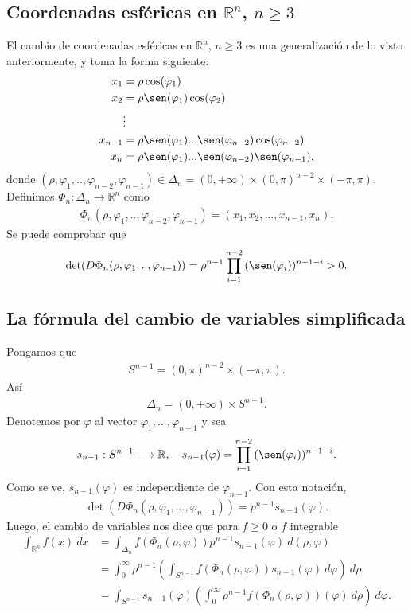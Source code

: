 \subsection{Coordenadas esféricas en $\mathbb{R}^n$, $n \ge 3$}
El cambio de coordenadas esféricas en $\mathbb{R}^n$, $n \ge 3$ es una generalización de lo visto anteriormente, y toma la forma siguiente:
\begin{align*}
    x_1 &= \rho \cos(\varphi_1) \\
    x_2 &= \rho \sen(\varphi_1) \cos(\varphi_2) \\
        & \vdots \\
    x_{n-1} &=  \rho \sen(\varphi_1) ... \sen(\varphi_{n-2}) \cos(\varphi_{n-2})\\
    x_{n} &=  \rho \sen(\varphi_1) ...\sen(\varphi_{n-2}) \sen(\varphi_{n-1}),
\end{align*}
donde $(\rho, \varphi_1,..,\varphi_{n-2},\varphi_{n-1}) \in \Delta_n = (0,+\infty)\times(0,\pi)^{n-2}\times(-\pi,\pi)$. Definimos $\Phi_n : \Delta_n \longrightarrow \mathbb{R}^n$ como
\begin{align*}
    \Phi_n(\rho, \varphi_1,..,\varphi_{n-2},\varphi_{n-1}) = (x_1,x_2,...,x_{n-1},x_n).
\end{align*}
Se puede comprobar que
\begin{align*}
    \det(D\Phi_n(\rho, \varphi_1,..,\varphi_{n-1})) = \rho^{n-1}\prod_{i=1}^{n-2}{(\sen(\varphi_i))^{n-1-i}} > 0.
\end{align*}

\subsection{La fórmula del cambio de variables simplificada}
Pongamos que
\begin{align*}
    S^{n-1} = (0,\pi)^{n-2}\times(-\pi,\pi).
\end{align*}
Así
\begin{align*}
    \Delta_n = (0,+\infty)\times S^{n-1}.
\end{align*}
Denotemos por $\varphi$ al vector $\varphi_1,...,\varphi_{n-1}$ y sea
\begin{align*}
    s_{n-1} : S^{n-1} \longrightarrow \mathbb{R}, \ \ \ s_{n-1}(\varphi) = \prod_{i=1}^{n-2}{(\sen(\varphi_i))^{n-1-i}}.
\end{align*}
Como se ve, $s_{n-1}(\varphi)$ es independiente de $\varphi_{n-1}$. Con esta notación,
\begin{align*}
    \det(D\Phi_n(\rho,\varphi_1,...,\varphi_{n-1})) = p^{n-1}s_{n-1}(\varphi).
\end{align*}
Luego, el cambio de variables nos dice que para $f \ge 0$ o $f$ integrable
\begin{align*}
    \int_{\mathbb{R}^n}{f(x) \ dx} &= \int_{\Delta_n}{f(\Phi_n(\rho, \varphi))p^{n-1}s_{n-1}(\varphi) \ d(\rho, \varphi)} \\
    &= \int_{0}^{\infty} \rho^{n-1}\left( \int_{S^{n-1}}{f(\Phi_n(\rho, \varphi))s_{n-1}(\varphi) \ d\varphi} \right) \ d\rho \\
    &= \int_{S^{n-1}}  s_{n-1}(\varphi)\left( \int_{0}^{\infty}{\rho^{n-1}f(\Phi_n(\rho, \varphi))(\varphi) \ d\rho} \right) \ d\varphi.
\end{align*}

